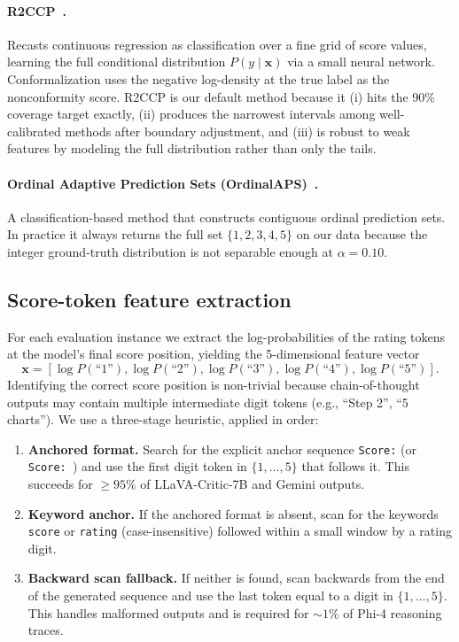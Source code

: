 \documentclass{article}
\begin{document}
\paragraph{R2CCP~\citep{guha2024conformal}.}
Recasts continuous regression as classification over a fine grid of score values, learning the full conditional distribution $P(y \mid \mathbf{x})$ via a small neural network. Conformalization uses the negative log-density at the true label as the nonconformity score. R2CCP is our default method because it (i) hits the 90\% coverage target exactly, (ii) produces the narrowest intervals among well-calibrated methods after boundary adjustment, and (iii) is robust to weak features by modeling the full distribution rather than only the tails.

\paragraph{Ordinal Adaptive Prediction Sets (OrdinalAPS)~\citep{lu2022fair}.}
A classification-based method that constructs contiguous ordinal prediction sets. In practice it always returns the full set $\{1,2,3,4,5\}$ on our data because the integer ground-truth distribution is not separable enough at $\alpha = 0.10$.

\subsection{Score-token feature extraction}
\label{app:feature_extraction}

For each evaluation instance we extract the log-probabilities of the rating tokens at the model's final score position, yielding the 5-dimensional feature vector
\[
\mathbf{x} = [\log P(\text{``1''}), \log P(\text{``2''}), \log P(\text{``3''}), \log P(\text{``4''}), \log P(\text{``5''})].
\]
Identifying the correct score position is non-trivial because chain-of-thought outputs may contain multiple intermediate digit tokens (e.g., ``Step 2'', ``5 charts''). We use a three-stage heuristic, applied in order:

\begin{enumerate}[leftmargin=*,itemsep=2pt,topsep=2pt]
\item \textbf{Anchored format.} Search for the explicit anchor sequence \texttt{Score:} (or \texttt{Score: }) and use the first digit token in $\{1,\dots,5\}$ that follows it. This succeeds for $\geq 95\%$ of LLaVA-Critic-7B and Gemini outputs.
\item \textbf{Keyword anchor.} If the anchored format is absent, scan for the keywords \texttt{score} or \texttt{rating} (case-insensitive) followed within a small window by a rating digit.
\item \textbf{Backward scan fallback.} If neither is found, scan backwards from the end of the generated sequence and use the last token equal to a digit in $\{1,\dots,5\}$. This handles malformed outputs and is required for $\sim 1\%$ of Phi-4 reasoning traces.
\end{enumerate}
\end{document}
